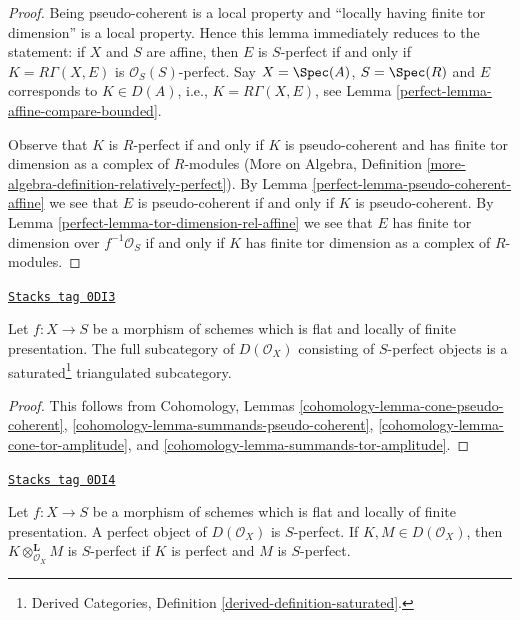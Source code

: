 \begin{proof}

Being pseudo-coherent is a local property and
``locally having finite tor dimension'' is a local property.
Hence this lemma immediately reduces to the statement:
if $X$ and $S$ are affine, then $E$ is $S$-perfect
if and only if $K = R\Gamma(X, E)$ is $\mathcal{O}_S(S)$-perfect.
Say $X = \Spec(A)$, $S = \Spec(R)$ and $E$ corresponds to
$K \in D(A)$, i.e., $K = R\Gamma(X, E)$, see
Lemma \ref{perfect-lemma-affine-compare-bounded}.

\medskip\noindent
Observe that $K$ is $R$-perfect if and only if $K$ is
pseudo-coherent and has finite tor dimension as a complex
of $R$-modules (More on Algebra, Definition
\ref{more-algebra-definition-relatively-perfect}).
By Lemma \ref{perfect-lemma-pseudo-coherent-affine}
we see that $E$ is pseudo-coherent if and only if
$K$ is pseudo-coherent.
By Lemma \ref{perfect-lemma-tor-dimension-rel-affine} we see that
$E$ has finite tor dimension over $f^{-1}\mathcal{O}_S$
if and only if $K$ has finite tor dimension as a complex of
$R$-modules.
\end{proof}

\begin{lemma}[Triangulated]
\label{perfect-lemma-triangulated}
\href{https://stacks.math.columbia.edu/tag/0DI3}{\texttt{Stacks tag 0DI3}}

Let $f : X \to S$ be a morphism of schemes which is
flat and locally of finite presentation. The full subcategory
of $D(\mathcal{O}_X)$ consisting of $S$-perfect objects is
a saturated\footnote{Derived Categories, Definition
\ref{derived-definition-saturated}.} triangulated subcategory.
\end{lemma}

\begin{proof}
This follows from Cohomology, Lemmas
\ref{cohomology-lemma-cone-pseudo-coherent},
\ref{cohomology-lemma-summands-pseudo-coherent},
\ref{cohomology-lemma-cone-tor-amplitude}, and
\ref{cohomology-lemma-summands-tor-amplitude}.
\end{proof}

\begin{lemma}
\label{perfect-lemma-perfect-relatively-perfect}
\href{https://stacks.math.columbia.edu/tag/0DI4}{\texttt{Stacks tag 0DI4}}

Let $f : X \to S$ be a morphism of schemes which is flat and locally
of finite presentation. A perfect object of $D(\mathcal{O}_X)$ is $S$-perfect.
If $K, M \in D(\mathcal{O}_X)$, then $K \otimes_{\mathcal{O}_X}^\mathbf{L} M$
is $S$-perfect if $K$ is perfect and $M$ is $S$-perfect.
\end{lemma}

